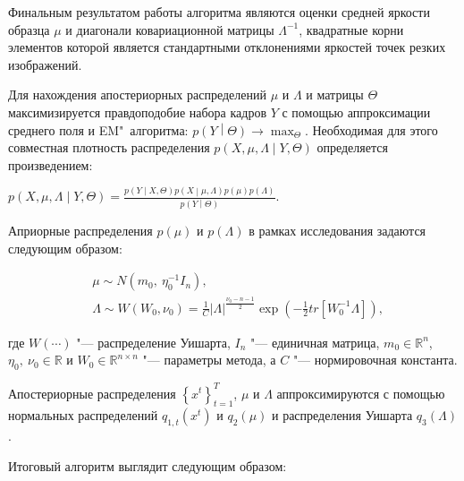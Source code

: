 Финальным результатом работы алгоритма являются оценки средней яркости образца $\mu$ и диагонали ковариационной матрицы $\Lambda^{-1}$, квадратные корни элементов которой является стандартными отклонениями яркостей точек резких изображений.

Для нахождения апостериорных распределений $\mu$ и $\Lambda$ и матрицы $\Theta$ максимизируется правдоподобие набора кадров $Y$ с помощью аппроксимации среднего поля и EM"~алгоритма: $p\left(Y\middle|\Theta\right) \rightarrow \max_{\Theta}$.
Необходимая для этого совместная плотность распределения $p\left(X,\mu,\Lambda\middle|Y,\Theta\right)$ определяется произведением:

$p\left(X,\mu,\Lambda\middle|Y,\Theta\right)=\frac{p\left(Y\middle|X,\Theta\right)p\left(X\middle|\mu,\Lambda\right)p\left(\mu\right)p\left(\Lambda\right)}{p\left(Y\middle|\Theta\right)}$.

Априорные распределения $p\left(\mu\right)$ и $p\left(\Lambda\right)$ в рамках исследования задаются следующим образом:

\begin{align*}
	&\mu \sim N\left(m_0,\ \eta_0^{-1}I_n\right), \\
	&\Lambda \sim W\left(W_0,\nu_0\right)=\frac{1}{C}\left|\Lambda\right|^\frac{\nu_0-n-1}{2}\exp{\left(-\frac{1}{2}tr\left[W_0^{-1}\Lambda\right]\right)},
\end{align*}

\noindent где $W(\cdots)$ "--- распределение Уишарта, $I_n$ "--- единичная матрица, $m_0\in\mathbb{R}^n$, $\eta_0,\ \nu_0\in\mathbb{R}$ и $W_0\in\mathbb{R}^{n \times n}$ "--- параметры метода, а $C$ "--- нормировочная константа.

Апостериорные распределения $\left\{x^t\right\}_{t=1}^T$, $\mu$ и $\Lambda$ аппроксимируются с помощью нормальных распределений $q_{1,t}\left(x^t\right)$ и $q_2\left(\mu\right)$ и распределения Уишарта $q_3\left(\Lambda\right)$.

Итоговый алгоритм выглядит следующим образом:

